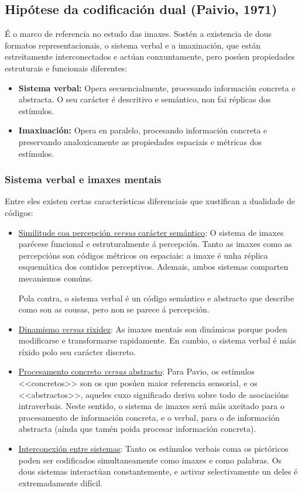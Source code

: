 \documentclass[a4paper,11pt]{article}
\begin{document}
\subsection{Hipótese da codificación dual (Paivio, 1971)}
É o marco de referencia no estudo das imaxes. Sostén a existencia de dous formatos representacionais, o sistema verbal e a imaxinación, que están estreitamente interconectados e actúan conxuntamente, pero posúen propiedades estruturais e funcionais diferentes:
\begin{itemize}
	\item \textbf{Sistema verbal:} Opera secuencialmente, procesando información concreta e 
	abstracta. O seu carácter é descritivo e semántico, non fai réplicas dos estímulos.
	\item \textbf{Imaxinación:} Opera en paralelo, procesando información concreta e preservando 
	analoxicamente as propiedades espaciais e métricas dos estímulos. 
\end{itemize}

\subsubsection{Sistema verbal e imaxes mentais}
Entre eles existen certas características diferenciais que xustifican a dualidade de códigos: 
\begin{itemize}
	\item \underline{Similitude coa percepción \textit{versus} carácter semántico}: O sistema de 
	imaxes parécese funcional e estruturalmente á percepción. Tanto as imaxes como as percepcións 
	son códigos métricos ou espaciais: a imaxe é unha réplica esquemática dos contidos perceptivos.
	Ademais, ambos sistemas comparten mecanismos comúns.
	
	Pola contra, o sistema verbal é un código semántico e abstracto que describe como son as cousas, 
	pero non se parece á percepción.
	\item \underline{Dinamismo \textit{versus} rixidez}: As imaxes mentais son dinámicas porque 
	poden modificarse e transformarse rapidamente. En cambio, o sistema verbal é máis ríxido polo 
	seu carácter discreto.
	\item \underline{Procesamento concreto \textit{versus} abstracto}: Para Pavio, os estímulos 
	<<concretos>> son os que posúen maior referencia sensorial, e os <<abstractos>>, aqueles cuxo 
	significado deriva sobre todo de asociacións intraverbais. Neste sentido, o sistema de imaxes 
	será máis axeitado para o procesamento de información concreta, e o verbal, para o de 
	información abstracta (aínda que tamén poida procesar información concreta).
	\item \underline{Interconexión entre sistemas}: Tanto os estímulos verbais coma os pictóricos 
	poden ser codificados simultaneamente como imaxes e como palabras. Os dous sistemas interactúan 
	constantemente, e activar selectivamente un deles é extremadamente difícil.
\end{itemize}
\end{document}
